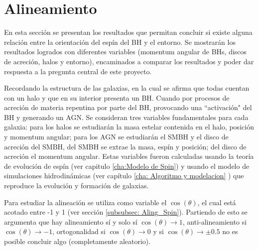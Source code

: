 \section{ Alineamiento}
\label{sec: Alineamiento}

En esta sección se presentan los resultados que permitan concluir si existe alguna relación entre la orientación del espín del BH y el entorno. Se mostrarán los resultados logrados con diferentes variables (momentum angular de BHs, discos de acreción, halos y entorno), encaminados a comparar los resultados y poder dar respuesta a la pregunta central de este proyecto. 

Recordando la estructura de las galaxias, en la cual se afirma que todas cuentan con un halo y que en su interior presenta un BH. Cuando por procesos de acreción de materia repentina por parte del BH, provocando una ``activación"\hspace{0.1cm} del BH y generando un AGN.
Se consideran tres variables fundamentales para cada galaxia: para los halos se estudiarán la masa estelar contenida en el halo, posición y momentum angular; para los AGN se estudiarán el SMBH y el disco de acreción del SMBH, del SMBH se extrae la masa, espín y posición; del disco de acreción el momentum angular. Estas variables fueron calculadas usando la teoría de evolución de espín (ver capitulo \ref{cha:Modelo de Spin}) y usando el modelo de simulaciones hidrodinámicas (ver capítulo \ref{cha: Algoritmo y modelacion} ) que reproduce la evolución y formación de galaxias. 

Para estudiar la alineación se utiliza como variable el $\cos (\theta)$, el cual está acotado entre -1 y 1 (ver sección \ref{subsubsec: Aling_Spin}). Partiendo de esto se argumenta que hay alineamiento sí y solo sí  $\cos (\theta) \to 1$, anti-alineamiento si $\cos (\theta)\to -1$, ortogonalidad si $\cos (\theta)\to 0$ y si $\cos (\theta)\to \pm 0.5 $ no es posible concluir algo (completamente aleatorio).



